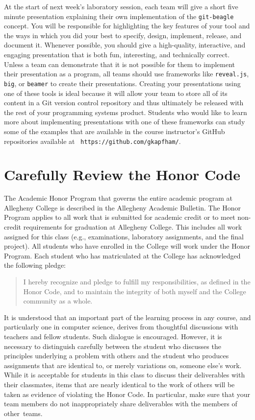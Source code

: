 At the start of next week's laboratory session, each team will give a short five minute presentation explaining their
own implementation of the {\tt git-beagle} concept. You will be responsible for highlighting the key features of your
tool and the ways in which you did your best to specify, design, implement, release, and document it. Whenever possible,
you should give a high-quality, interactive, and engaging presentation that is both fun, interesting, and technically
correct. Unless a team can demonstrate that it is not possible for them to implement their presentation as a program,
all teams should use frameworks like {\tt reveal.js}, {\tt big}, or {\tt beamer} to create their presentations. Creating
your presentations using one of these tools is ideal because it will allow your team to store all of its content in a
Git version control repository and thus ultimately be released with the rest of your programming systems product.
Students who would like to learn more about implementing presentations with one of these frameworks can study some of
the examples that are available in the course instructor's GitHub repositories available at {\tt
https://github.com/gkapfham/}.

\section*{Carefully Review the Honor Code}

The Academic Honor Program that governs the entire academic program at Allegheny College is described in the Allegheny
Academic Bulletin.  The Honor Program applies to all work that is submitted for academic credit or to meet non-credit
requirements for graduation at Allegheny College.  This includes all work assigned for this class (e.g., examinations,
  laboratory assignments, and the final project).  All students who have enrolled in the College will work under the Honor
Program.  Each student who has matriculated at the College has acknowledged the following pledge:

\vspace*{-.05in}
\begin{quote}
  I hereby recognize and pledge to fulfill my responsibilities, as defined in the Honor Code, and to maintain the
  integrity of both myself and the College community as a whole.
\end{quote}
\vspace*{-.05in}

\noindent It is understood that an important part of the learning process in any course, and particularly one in
computer science, derives from thoughtful discussions with teachers and fellow students.  Such dialogue is encouraged.
However, it is necessary to distinguish carefully between the student who discusses the principles underlying a problem
with others and the student who produces assignments that are identical to, or merely variations on, someone else's
work.  While it is acceptable for students in this class to discuss their deliverables with their classmates, items that
are nearly identical to the work of others will be taken as evidence of violating the Honor Code. In particular, make
sure that your team members do not inappropriately share deliverables with the members of \mbox{other teams}.

